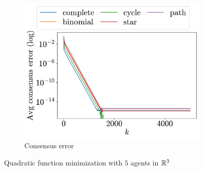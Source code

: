 \documentclass[a4paper,11pt,oneside]{book}
\begin{document}
\begin{figure}[H]
\begin{subfigure}[t]{0.46\linewidth}
            \centering
            \includegraphics[width=\linewidth]{./figs/quadratic/5_3/consensus.pdf} 
            \caption{Consensus error}
      \end{subfigure}
      \caption{Quadratic function minimization with $5$ agents in ${\mathbb{R}}^{3}$}
      \label{fig:quadratic_5_3}
\end{figure}
\end{document}
